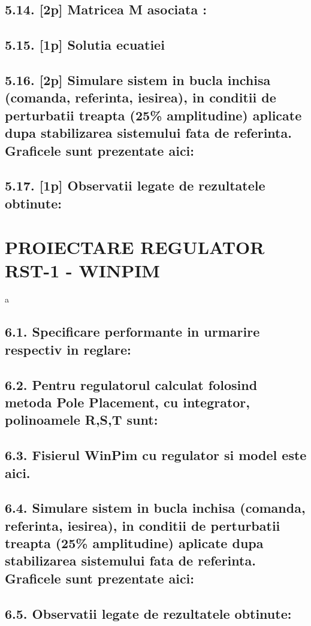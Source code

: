 \documentclass[12pt,english]{article}
\begin{document}
\subsection {5.14. [2p]  Matricea M asociata : }
\subsection {5.15. [1p] Solutia ecuatiei}
\subsection {5.16. [2p]  Simulare sistem in bucla inchisa (comanda, referinta, iesirea), in conditii de perturbatii treapta (25\% amplitudine) aplicate dupa stabilizarea sistemului fata de referinta. Graficele sunt prezentate aici: }
\subsection {5.17. [1p] Observatii legate de rezultatele obtinute: }

\section {PROIECTARE REGULATOR RST-1 - WINPIM }
a
\subsection {6.1. Specificare performante in urmarire respectiv in reglare: }
\subsection {6.2. Pentru regulatorul calculat folosind metoda Pole Placement, cu integrator, polinoamele R,S,T sunt: }
\subsection {6.3. Fisierul WinPim cu regulator si model este aici. }
\subsection {6.4. Simulare sistem in bucla inchisa (comanda, referinta, iesirea), in conditii de perturbatii treapta (25\% amplitudine) aplicate dupa stabilizarea sistemului fata de referinta. Graficele sunt prezentate aici: }
\subsection {6.5. Observatii legate de rezultatele obtinute: }
\end{document}
